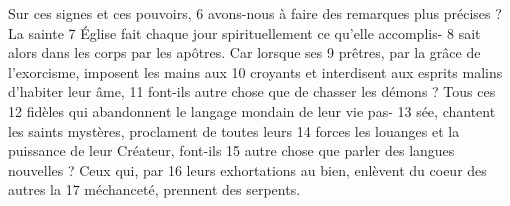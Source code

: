 Sur ces signes et ces pouvoirs,	 
6	 	avons-nous à faire des remarques plus précises ? La sainte	 
7	 	Église fait chaque jour spirituellement ce qu'elle accomplis-	 
8	 	sait alors dans les corps par les apôtres. Car lorsque ses	 
9	 	prêtres, par la grâce de l'exorcisme, imposent les mains aux	 
10	 	croyants et interdisent aux esprits malins d'habiter leur âme,	 
11	 	font-ils autre chose que de chasser les démons ? Tous ces	 
12	 	fidèles qui abandonnent le langage mondain de leur vie pas-	 
13	 	sée, chantent les saints mystères, proclament de toutes leurs	 
14	 	forces les louanges et la puissance de leur Créateur, font-ils	 
15	 	autre chose que parler des langues nouvelles ? Ceux qui, par	 
16	 	leurs exhortations au bien, enlèvent du coeur des autres la	 
17	 	méchanceté, prennent des serpents.